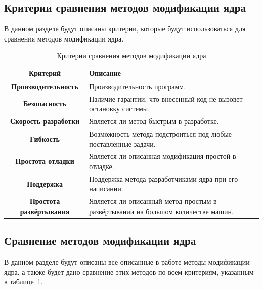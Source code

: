 \subsection{Критерии сравнения методов модификации ядра}\label{sec:----}
В данном разделе будут описаны критерии, которые будут использоваться для сравнения методов модификации ядра.

\begin{table}[ht]
\begin{center}
    \begin{threeparttable}
      \captionsetup{justification=raggedright,singlelinecheck=off}
      \caption{\label{tab:criteria}Критерии сравнения методов модификации ядра}
        \begin{tabular}{|c|p{8cm}|}
        \hline
        \textbf{Критерий} & \textbf{Описание} \\ \hline
        \textbf{Производительность} & Производительность программ. \\ \hline
        \textbf{Безопасность} & Наличие гарантии, что внесенный код не вызовет остановку системы. \\ \hline
        \textbf{Скорость разработки} & Является ли метод быстрым в разработке. \\ \hline
        \textbf{Гибкость} & Возможность метода подстроиться под любые поставленные задачи. \\ \hline
        \textbf{Простота отладки} & Является ли описанная модификация простой в отладке. \\ \hline
        \textbf{Поддержка} & Поддержка метода разработчиками ядра при его написании. \\ \hline
        \textbf{Простота развёртывания} & Является ли описанный метод простым в развёртывании на большом количестве машин. \\ \hline
        \end{tabular}
    \end{threeparttable}
\end{center}
\end{table}
\newpage
\subsection{Сравнение методов модификации ядра}\label{sec:---}
В данном разделе будут описаны все описанные в работе методы модификации ядра, а также будет дано сравнение этих методов по всем критериям, указанным в таблице~\ref{tab:criteria}.

